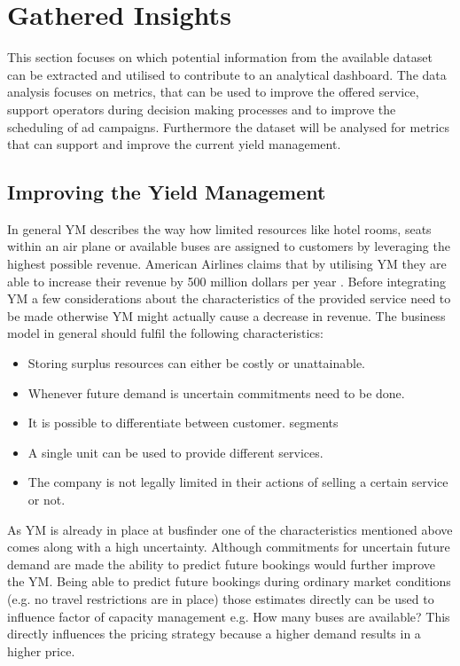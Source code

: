 %
%
% 
% 
% 


\chapter{Gathered Insights}
\label{chap:insights}
This section focuses on which potential information from the available dataset can be extracted and utilised to contribute to an analytical dashboard. The data analysis focuses on metrics, that can be used to improve the offered service, support operators during decision making processes and to improve the scheduling of ad campaigns. Furthermore the dataset will be analysed for metrics that can support and improve the current yield management. 


\section{Improving the Yield Management}
In general YM describes the way how limited resources like hotel rooms, seats within an air plane or available buses are assigned to customers by leveraging the highest possible revenue. American Airlines claims that by utilising YM they are able to increase their revenue by 500 million dollars per year \cite{ym_practice}. Before integrating YM a few considerations about the characteristics of the provided service need to be made otherwise YM might actually cause a decrease in revenue. The business model in general should fulfil the following characteristics:\cite{ym_practice}
\begin{itemize}
  \item Storing surplus resources can either be costly or unattainable. 
  \item Whenever future demand is uncertain commitments need to be done.
  \item It is possible to differentiate between customer. segments
  \item A single unit can be used to provide different services. 
  \item The company is not legally limited in their actions of selling a certain service or not.
\end{itemize}
As YM is already in place at busfinder one of the characteristics mentioned above comes along with a high uncertainty. Although commitments for uncertain future demand are made the ability to predict future bookings would further improve the YM. Being able to predict future bookings during ordinary market conditions (e.g. no travel restrictions are in place) those estimates directly can be used to influence factor of capacity management e.g. How many buses are available? This directly influences the pricing strategy because a higher demand results in a higher price.

